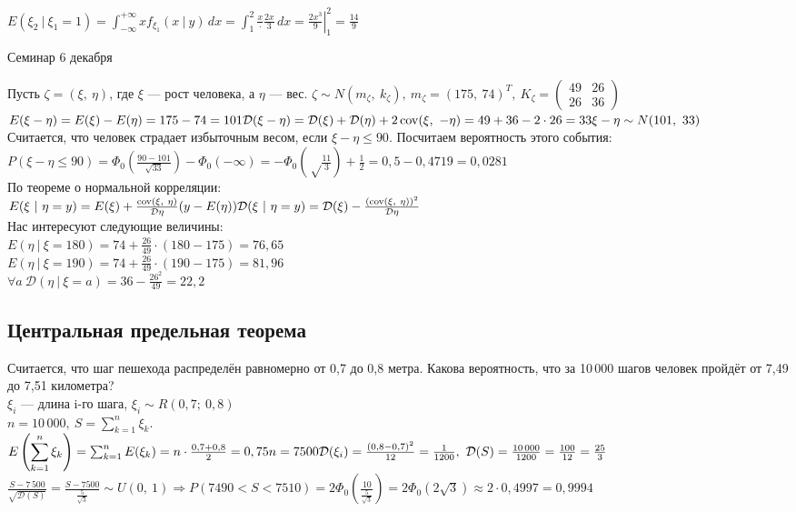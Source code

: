 \documentclass[12pt, a4paper]{article}
\newcommand{\cov}{\operatorname{cov}}
\begin{document}
    $\displaystyle E(\xi_2\ |\ \xi_1 = 1) = \int_{-\infty}^{+\infty} x f_{\xi_1}(x\ |\ y)\, dx = \int_1^2 \frac{x}\cdot \frac{2x}{3}\, dx = \left.\frac{2x^3}{9}\right|_1^2 = \frac{14}{9}$
    \begin{center}
        Семинар 6 декабря
    \end{center}
    Пусть $\zeta = (\xi,\ \eta)$, где $\xi$ --- рост человека, а $\eta$ --- вес.
    $\zeta \sim N(m_{\zeta},\ k_{\zeta}),\ m_{\zeta} = (175,\ 74)^T,\ K_{\zeta} = \begin{pmatrix}
        49 & 26\\
        26 & 36
    \end{pmatrix}$\\
    $E(\xi - \eta) = E(\xi) - E(\eta) = 175 - 74 = 101\\
    \mathcal{D}(\xi - \eta) = \mathcal{D}(\xi) + \mathcal{D}(\eta) + 2\cov(\xi,\ -\eta) = 49 + 36 - 2\cdot 26 = 33\\
    \xi - \eta \sim N(101,\ 33)$\\
    Считается, что человек страдает избыточным весом, если $\xi - \eta \leq 90$. Посчитаем вероятность этого события:
    $P(\xi - \eta \leq 90) = \Phi_0\left( \frac{90 - 101}{\sqrt{33}} \right) - \Phi_0(-\infty) = -\Phi_0\left(\sqrt\frac{11}{3}\right) + \frac{1}{2} = 0,5 - 0,4719 = 0,0281$\\
    По теореме о нормальной корреляции:\\
    $E(\xi\ |\ \eta = y) = E(\xi) + \frac{\cov(\xi,\ \eta)}{\mathcal{D}\eta}(y - E(\eta))\\
    \mathcal{D}(\xi\ |\ \eta = y) = \mathcal{D}(\xi) - \frac{(\cov(\xi,\ \eta))^2}{\mathcal{D}\eta}$\\
    Нас интересуют следующие величины:\\
    $E(\eta\ |\ \xi = 180) = 74 + \frac{26}{49}\cdot (180 - 175) = 76,65$\\
    $E(\eta\ |\ \xi = 190) = 74 + \frac{26}{49}\cdot (190 - 175) = 81,96$\\
    $\forall a\ \mathcal{D}(\eta\ |\ \xi = a) = 36 - \frac{26^2}{49} = 22,2$
    \subsection*{Центральная предельная теорема}
    Считается, что шаг пешехода распределён равномерно от 0,7 до 0,8 метра. Какова вероятность, что за 10\,000 шагов человек пройдёт от 7,49 до 7,51 километра?\\
    $\xi_i$ --- длина i-го шага, $\xi_i\sim R(0,7;\ 0,8)$\\
    $n = 10\,000,\ S = \displaystyle\sum_{k = 1}^{n} \xi_k.$\\
    $E\left( \displaystyle\sum_{k = 1}^{n} \xi_k \right) = \sum_{k = 1}^{n} E(\xi_k) = n\cdot \frac{0,7 + 0,8}{2} = 0,75 n = 7500\\
    \mathcal{D}(\xi_i) = \frac{(0,8 - 0,7)^2}{12} = \frac{1}{1200},\ \mathcal{D}(S) = \frac{10\,000}{1200} = \frac{100}{12} = \frac{25}{3}$\\
    $\frac{S - 7\,500}{\sqrt{\mathcal{D}(S)}} = \frac{S - 7500}{\frac{5}{\sqrt{3}}}\sim U(0,\ 1)\Rightarrow P\left( 7490 < S < 7510 \right) = 2\Phi_0\left(\frac{10}{\frac{5}{\sqrt{3}}}\right) = 2\Phi_0(2\sqrt{3}) \approx 2\cdot 0,4997 = 0,9994$
\end{document}
